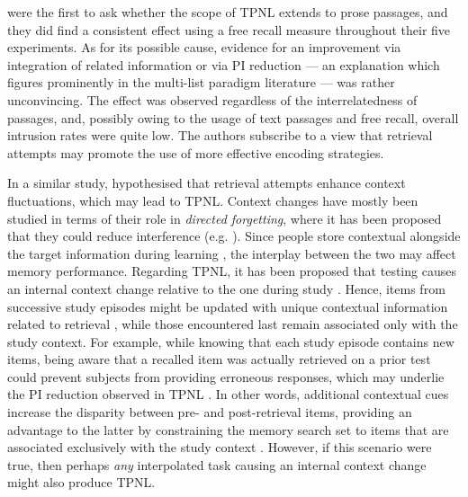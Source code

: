 \documentclass[../main.tex]{subfiles}
\begin{document}
\cite{wissmanInterimTestEffect2011} were the first to ask whether the scope 
of TPNL extends to prose passages, and they did find a consistent effect 
using a free recall measure throughout their five experiments. As for its 
possible cause, evidence for an improvement via integration of related 
information or via PI reduction --- an explanation which figures prominently 
in the multi-list paradigm literature \citep{darleyEffectsPriorFree1971, 
szpunarTestingStudyInsulates2008} --- was rather unconvincing. The effect 
was observed regardless of the interrelatedness of passages, and, possibly 
owing to the usage of text passages and free recall, overall intrusion 
rates were quite low. The authors subscribe to a view that retrieval 
attempts may promote the use of more effective encoding strategies. 

In a similar study, \cite{divisRetrievalSpeedsContext2014} hypothesised that 
retrieval attempts enhance context fluctuations, which may lead to TPNL. 
Context changes have mostly been studied in terms of their role in 
\textit{directed forgetting}, where it has been proposed that they could 
reduce interference (e.g. \citealp{sahakyanContextualChangeAccount2002}). 
Since people store contextual alongside the target information during 
learning \citep{howardDistributedRepresentationTemporal2002,
	tulvingEncodingSpecificityRetrieval1973, 
	mensinkModelInterferenceForgetting1988}, the 
interplay between the two may affect memory performance. Regarding TPNL, it 
has been proposed that testing causes an internal context change relative to 
the one during study \citep{jangContextRetrievalContext2008, 
jonkerPuttingRetrievalinducedForgetting2013, 
pastotterRetrievalLearningFacilitates2011}. Hence, items 
from successive study episodes might be updated with unique contextual 
information related to retrieval \citep{karpickeRetrievalBasedLearning2014, 
lehmanEpisodicContextAccount2014}, while those encountered last remain 
associated only with the study context. For example, while knowing that 
each study episode contains new items, being aware that a recalled item was 
actually retrieved on a prior test could prevent subjects from providing 
erroneous responses, which may underlie the PI reduction observed in TPNL 
\citep{szpunarTestingStudyInsulates2008, johnsonSourceMonitoring1993}. In 
other words, additional contextual cues increase the disparity between pre- 
and post-retrieval items, providing an advantage to the latter by 
constraining the memory search set to items that are associated exclusively 
with the study context \citep{szpunarTestingStudyInsulates2008}. However, if 
this scenario were true, then perhaps \textit{any} interpolated 
task causing an internal context change might also produce TPNL.
\end{document}
